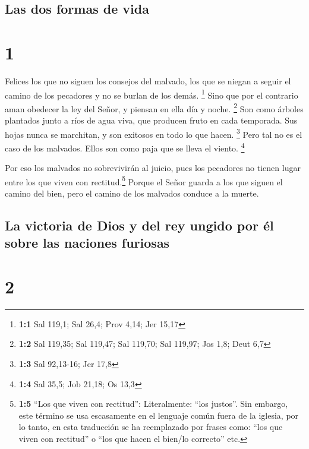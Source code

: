\hypertarget{las-dos-formas-de-vida}{%
\subsection{Las dos formas de vida}\label{las-dos-formas-de-vida}}

\hypertarget{section}{%
\section{1}\label{section}}

 Felices los que no siguen los consejos del malvado, los
que se niegan a seguir el camino de los pecadores y no se burlan de los
demás. \footnote{\textbf{1:1} Sal 119,1; Sal 26,4; Prov 4,14; Jer 15,17}
 Sino que por el contrario aman obedecer la ley del Señor,
y piensan en ella día y noche. \footnote{\textbf{1:2} Sal 119,35; Sal
  119,47; Sal 119,70; Sal 119,97; Jos 1,8; Deut 6,7}  Son
como árboles plantados junto a ríos de agua viva, que producen fruto en
cada temporada. Sus hojas nunca se marchitan, y son exitosos en todo lo
que hacen. \footnote{\textbf{1:3} Sal 92,13-16; Jer 17,8} 
Pero tal no es el caso de los malvados. Ellos son como paja que se lleva
el viento. \footnote{\textbf{1:4} Sal 35,5; Job 21,18; Os 13,3}

 Por eso los malvados no sobrevivirán al juicio, pues los
pecadores no tienen lugar entre los que viven con rectitud.\footnote{\textbf{1:5}
  ``Los que viven con rectitud'': Literalmente: ``los justos''. Sin
  embargo, este término se usa escasamente en el lenguaje común fuera de
  la iglesia, por lo tanto, en esta traducción se ha reemplazado por
  frases como: ``los que viven con rectitud'' o ``los que hacen el
  bien/lo correcto'' etc.}  Porque el Señor guarda a los
que siguen el camino del bien, pero el camino de los malvados conduce a
la muerte.

\hypertarget{la-victoria-de-dios-y-del-rey-ungido-por-uxe9l-sobre-las-naciones-furiosas}{%
\subsection{La victoria de Dios y del rey ungido por él sobre las
naciones
furiosas}\label{la-victoria-de-dios-y-del-rey-ungido-por-uxe9l-sobre-las-naciones-furiosas}}

\hypertarget{section-1}{%
\section{2}\label{section-1}}

